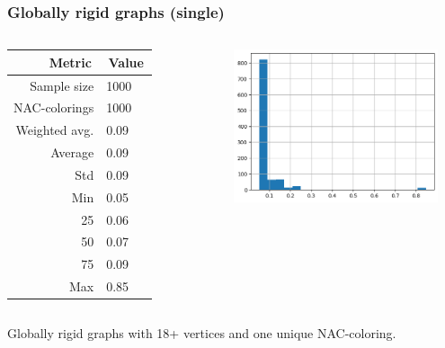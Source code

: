 \documentclass{beamer}
\begin{document}
\begin{frame}
	\frametitle{Globally rigid graphs (single)}
	\begin{columns}

		\begin{table}[ht]
			\centering
			\begin{tabular}{r|l}
				\toprule
				\,Metric\,    & \,Value\, \\
				\midrule
				Sample size   & 1000      \\
				NAC-colorings & 1000      \\
				Weighted avg. & 0.09      \\
				Average       & 0.09      \\
				Std           & 0.09      \\
				Min           & 0.05      \\
				25            & 0.06      \\
				50            & 0.07      \\
				75            & 0.09      \\
				Max           & 0.85      \\
				\bottomrule
			\end{tabular}
		\end{table}


		\includegraphics[width=0.9\textwidth]{./assets/presentation_reviewer_globally_rigid_single.png}

	\end{columns}

	\centering
	Globally rigid graphs with 18+ vertices and one unique NAC-coloring.
\end{frame}
\end{document}

